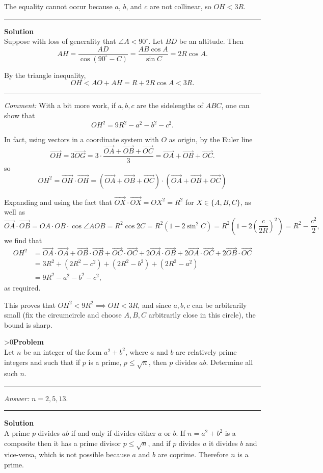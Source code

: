 \documentclass[12pt,oneside,a4paper]{book}
\newcounter{probnum}
\newcounter{solnum}
\newcommand{\prob}{\ifnum\value{probnum}>0\newpage\fi\setcounter{solnum}{0}\stepcounter{probnum}\textbf{Problem \theprobnum}\\}
\newcommand{\ans}{\medskip\hrule\medbreak\emph{Answer: }}
\newcommand{\comment}{\medskip\hrule\medbreak\emph{Comment: }}
\newcommand{\sol}{\medskip\hrule\medbreak\textbf{Solution}\\}
\newcommand{\soln}{\stepcounter{solnum}\medskip\hrule\medbreak\textbf{Solution \thesolnum}\\}
\begin{document}
The equality cannot occur because $a$, $b$, and $c$ are not collinear, so $OH < 3R$.

\soln
Suppose with loss of generality that $\angle A < 90^\circ$. Let $BD$ be an altitude. Then
\[AH = \frac{AD}{\cos(90^\circ-C)} = \frac{AB\cos A}{\sin C} = 2R\cos A.\]

By the triangle inequality,
\[OH < AO + AH = R + 2R\cos A < 3R.\]

\comment
With a bit more work, if $a,b,c$ are the sidelengths of $ABC$, one can show that
\[OH^2 = 9R^2 - a^2 - b^2 - c^2.\]

In fact, using vectors in a coordinate system with $O$ as origin, by the Euler line
\[\overrightarrow{OH} = 3\overrightarrow{OG} = 3\cdot \frac{\overrightarrow{OA} + \overrightarrow{OB} + \overrightarrow{OC}}3 = \overrightarrow{OA} + \overrightarrow{OB} + \overrightarrow{OC}.\]
so
\[OH^2 = \overrightarrow{OH}\cdot \overrightarrow{OH}
= (\overrightarrow{OA} + \overrightarrow{OB} + \overrightarrow{OC})\cdot(\overrightarrow{OA} + \overrightarrow{OB} + \overrightarrow{OC})\]

Expanding and using the fact that $\overrightarrow{OX}\cdot \overrightarrow{OX} = OX^2 = R^2$ for $X \in \{A,B,C\}$, as well as
\[\overrightarrow{OA}\cdot \overrightarrow{OB} = OA\cdot OB\cdot\cos\angle AOB = R^2\cos 2C = R^2(1-2\sin^2C) = R^2\left(1 - 2\left(\frac c{2R}\right)^2\right)
= R^2 - \frac{c^2}2,\]
we find that
\begin{align*}
OH^2 &= \overrightarrow{OA}\cdot \overrightarrow{OA} + \overrightarrow{OB}\cdot \overrightarrow{OB} + \overrightarrow{OC}\cdot \overrightarrow{OC}
+ 2\overrightarrow{OA}\cdot \overrightarrow{OB} + 2\overrightarrow{OA}\cdot \overrightarrow{OC} + 2\overrightarrow{OB}\cdot \overrightarrow{OC}\\
&= 3R^2 + (2R^2-c^2) + (2R^2-b^2) + (2R^2-a^2)\\
&= 9R^2 - a^2 - b^2 - c^2,
\end{align*}
as required.

This proves that $OH^2 < 9R^2\implies OH < 3R$, and since $a,b,c$ can be arbitrarily small (fix the circumcircle and choose $A,B,C$ arbitrarily close in this circle), the bound is sharp.

\prob Let $n$ be an integer of the form $a^2+b^2$, where $a$ and $b$ are relatively prime integers and such that if $p$ is a prime, $p\le \sqrt n$, then $p$ divides $ab$. Determine all such $n$.

\ans $n=2,5,13$.

\sol
A prime $p$ divides $ab$ if and only if divides either $a$ or $b$. If $n=a^2+b^2$ is a composite then it has a prime divisor $p\le \sqrt n$, and if $p$ divides $a$ it divides $b$ and vice-versa, which is not possible because $a$ and $b$ are coprime. Therefore $n$ is a prime.
\end{document}
